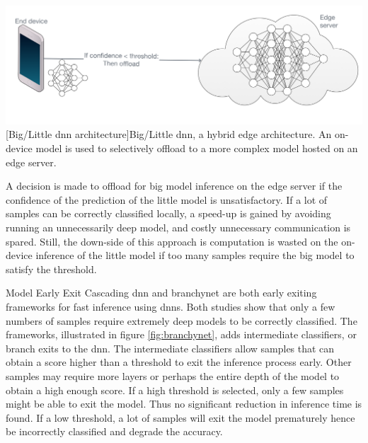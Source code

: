 \begin{enumdescript}
	\begin{minipage}[t]{\linewidth}    
		\centering                          
		\includegraphics[width=.8\linewidth]{figures/models/big_little_dnn}
		[Big/Little \gls{dnn} architecture]{Big/Little \gls{dnn}, a hybrid edge architecture. An on-device model is used to selectively offload to a more complex model hosted on an edge server.}
		\label{fig:big/little-dnn}
	\end{minipage}
	
	A decision is made to offload for big model inference on the edge server if the confidence of the prediction of the little model is unsatisfactory. If a lot of samples can be correctly classified locally, a speed-up is gained by avoiding running an unnecessarily deep model, and costly unnecessary communication is spared. Still, the down-side of this approach is computation is wasted on the on-device inference of the little model if too many samples require the big model to satisfy the threshold. 
	
	\item[Model Early Exit] Cascading \gls{dnn} \cite{leroux_resource-constrained_2015} and \gls{branchynet} \cite{teerapittayanon_branchynet:_2016} are both early exiting frameworks for fast inference using \gls{dnn}s. Both studies show that only a few numbers of samples require extremely deep models to be correctly classified. The frameworks, illustrated in figure \ref{fig:branchynet}, adds intermediate classifiers, or branch exits to the \gls{dnn}. The intermediate classifiers allow samples that can obtain a score higher than a threshold to exit the inference process early. Other samples may require more layers or perhaps the entire depth of the model to obtain a high enough score. If a high threshold is selected, only a few samples might be able to exit the model. Thus no significant reduction in inference time is found. If a low threshold, a lot of samples will exit the model prematurely hence be incorrectly classified and degrade the accuracy. 
	

\end{enumdescript}
